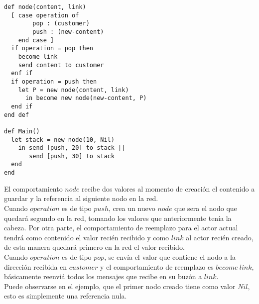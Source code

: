 \begin{lstlisting}[language=sal, style=simple]
def node(content, link)
  [ case operation of
        pop : (customer)
        push : (new-content)
    end case ]
  if operation = pop then
    become link
    send content to customer
  enf if
  if operation = push then
    let P = new node(content, link)
      in become new node(new-content, P) 
  end if
end def

def Main() 
  let stack = new node(10, Nil)
    in send [push, 20] to stack ||
       send [push, 30] to stack
  end
end
\end{lstlisting}

El comportamiento $node$ recibe dos valores al momento de creación el contenido a guardar y la referencia al siguiente nodo en la red. \\
Cuando $operation$ es de tipo $push$, crea un nuevo $node$ que sera el nodo que quedará segundo en la red, 
tomando los valores que anteriormente tenía la cabeza. Por otra parte, el comportamiento de reemplazo para el actor actual tendrá 
como contenido el valor recién recibido y como $link$ al actor recién creado, de esta manera quedará primero en la red el valor recibido. \\
Cuando $operation$ es de tipo $pop$, se envía el valor que contiene el nodo a la dirección recibida en $customer$ y el comportamiento 
de reemplazo es $become\ link$, básicamente reenviá todos los mensajes que recibe en su buzón a $link$. \\
Puede observarse en el ejemplo, que el primer nodo creado tiene como valor $Nil$, esto es simplemente una referencia nula. 
